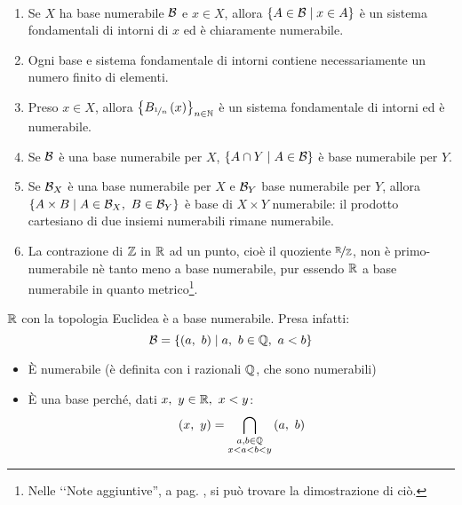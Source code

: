 \begin{demonstration}~{}
\begin{enumerate}[label=\Roman*]
	\item Se $X$ ha base numerabile $\mathcal{B}$ e $x\in X$, allora $\left\{A\in \mathcal{B}\mid x\in A\right\}$ è un sistema fondamentali di intorni di $x$ ed è chiaramente numerabile.
	\item Ogni base e sistema fondamentale di intorni contiene necessariamente un numero finito di elementi.
	\item Preso $x\in X$, allora $\left\{B_{\nicefrac{1}{n}}\left(x\right)\right\}_{n\in\mathbb{N}}$ è un sistema fondamentale di intorni ed è numerabile.
	\item Se $\mathcal{B}$ è una base numerabile per $X$, $\left\{A\cap Y\mid A\in \mathcal{B}\right\}$ è base numerabile per $Y$.
	\item Se $\mathcal{B}_X$ è una base numerabile per $X$ e $\mathcal{B}_Y$ base numerabile per $Y$, allora $\left\{A\times B\mid A\in \basis_X,\ B\in\basis_Y\right\}$ è base di $X\times Y$ numerabile: il prodotto cartesiano di due insiemi numerabili rimane numerabile.
	\item La contrazione di $\mathbb{Z}$ in $\mathbb{R}$ ad un punto, cioè il quoziente $\nicefrac{\mathbb{R}}{\mathbb{Z}}$, non è primo-numerabile nè tanto meno a base numerabile, pur essendo $\mathbb{R}$ a base numerabile in quanto metrico\footnote{Nelle ‘‘Note aggiuntive'', a pag. \pageref{dimostrazionenonnumerabilità}, si può trovare la dimostrazione di ciò.}.
\end{enumerate}
\end{demonstration}
\begin{example}
	$\mathbb{R}$ con la topologia Euclidea è a base numerabile. Presa infatti:
	\begin{equation*}
		\mathcal{B}=\left\{\left(a,\ b\right)\mid a,\ b\in \mathbb{Q},\ a<b\right\}
	\end{equation*}
	\begin{itemize}
		\item È numerabile (è definita con i razionali $\mathbb{Q}$, che sono numerabili)
		\item È una base perché, dati $x,\ y\in\realset,\ x<y$:
		\begin{equation*}
			\left(x,\ y\right)=\union_{\substack{a, b\in\rationalset\\ x<a<b<y}}\left(a,\ b\right)
		\end{equation*}
	\end{itemize}
\end{example}
